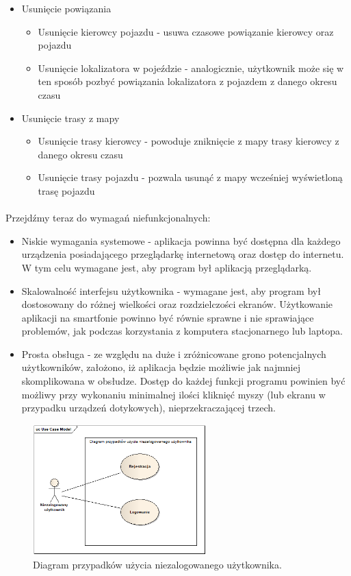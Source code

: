 \begin{itemize}
\item Usunięcie powiązania
\begin{itemize}
	\item Usunięcie kierowcy pojazdu - usuwa czasowe powiązanie kierowcy oraz pojazdu
	\item Usunięcie lokalizatora w pojeździe - analogicznie, użytkownik może się w ten sposób pozbyć powiązania lokalizatora z pojazdem z danego okresu czasu
\end{itemize}
\item Usunięcie trasy z mapy
\begin{itemize}
	\item Usunięcie trasy kierowcy - powoduje zniknięcie z mapy trasy kierowcy z danego okresu czasu
	\item Usunięcie trasy pojazdu - pozwala usunąć z mapy wcześniej wyświetloną trasę pojazdu 
\end{itemize}
\end{itemize}


\paragraph{}
Przejdźmy teraz do wymagań niefunkcjonalnych:

\begin{itemize}
	\item Niskie wymagania systemowe - aplikacja powinna być dostępna dla każdego urządzenia posiadającego przeglądarkę internetową oraz dostęp do internetu. W tym celu wymagane jest, aby program był aplikacją przeglądarką.
	\item Skalowalność interfejsu użytkownika - wymagane jest, aby program był dostosowany do różnej wielkości oraz rozdzielczości ekranów. Użytkowanie aplikacji na smartfonie powinno być równie sprawne i nie sprawiające problemów, jak podczas korzystania z komputera stacjonarnego lub laptopa.
	\item Prosta obsługa - ze względu na duże i zróżnicowane grono potencjalnych użytkowników, założono, iż aplikacja będzie możliwie jak najmniej skomplikowana w obsłudze. Dostęp do każdej funkcji programu powinien być możliwy przy wykonaniu minimalnej ilości kliknięć myszy (lub ekranu w przypadku urządzeń dotykowych), nieprzekraczającej trzech.
\end{itemize}

\begin{figure}
\centering
\includegraphics[width=0.6\textwidth]{./graf/Przypadki_uzycia_niezalogowany.png}
\caption{Diagram przypadków użycia niezalogowanego użytkownika.}
\label{fig:3.1}
\end{figure}


